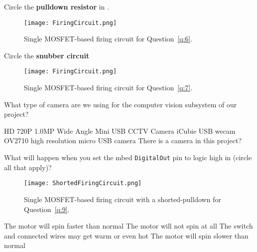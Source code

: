 \documentclass[addpoints,noanswers]{exam}
\begin{document}
\begin{questions}
\question[1]\label{q:6}
Circle the \textbf{pulldown resistor} in .
\begin{figure}[h]
\centering
	\texttt{[image: FiringCircuit.png]}
	\caption{Single MOSFET-based firing circuit for Question~\ref{q:6}.}
	\label{fig:FiringCircuitPulldown}
\end{figure}






\clearpage
\question[1]\label{q:7}
Circle the \textbf{snubber circuit} 
\begin{figure}[h]
\centering
	\texttt{[image: FiringCircuit.png]}
	\caption{Single MOSFET-based firing circuit for Question~\ref{q:7}.}
	\label{fig:FiringCircuitSnubber}
\end{figure}




\question[1]
What type of camera are we using for the computer vision subsystem of our project?
\begin{choices}
\choice HD 720P 1.0MP Wide Angle Mini USB CCTV Camera
\CorrectChoice iCubie USB wecam
\choice OV2710 high resolution micro USB camera
\choice There is a camera in this project?
\end{choices}







\question[1]\label{q:9}
What will happen when you set the mbed \lstinline{DigitalOut} pin to logic high in  (circle all that apply)?
\begin{figure}[h]
\centering
	\texttt{[image: ShortedFiringCircuit.png]}
	\caption{Single MOSFET-based firing circuit with a shorted-pulldown for Question~\ref{q:9}.}
	\label{fig:ShortedFiringCircuit}
\end{figure}
\begin{choices}
\choice The motor will spin faster than normal
\CorrectChoice The motor will not spin at all
\choice The switch and connected wires may get warm or even hot
\choice The motor will spin slower than normal 
\end{choices}






\end{questions}
\end{document}
